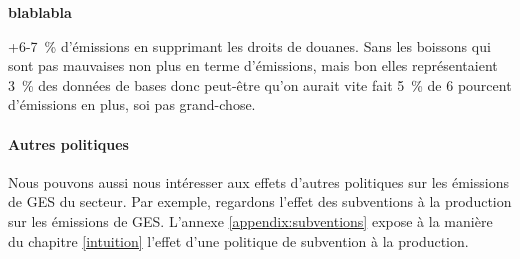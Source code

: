 \textbf{blablabla}

+6-7~\% d'émissions en supprimant les droits de douanes. Sans les boissons qui sont pas mauvaises non plus en terme d'émissions, mais bon elles représentaient 3~\% des données de bases donc peut-être qu'on aurait vite fait 5~\% de 6 pourcent d'émissions en plus, soi pas grand-chose.


\paragraph{Autres politiques}\label{Sec_subvention}
Nous pouvons aussi nous intéresser aux effets d'autres politiques sur les émissions de GES du secteur. Par exemple, regardons l'effet des subventions à la production sur les émissions de GES. L'annexe \ref{appendix:subventions} expose à la manière du chapitre \ref{intuition} l'effet d'une politique de subvention à la production.